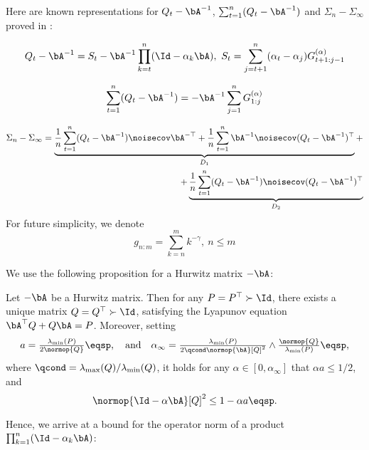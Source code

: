 Here are known representations for $Q_t - \bA^{-1}$, $\sum_{t=1}^n (Q_t - \bA^{-1})$ and $\Sigma_n -  \Sigma_{\infty}$ proved in \citep[pp. 26-30]{wu2024statisticalinferencetemporaldifference}:

\begin{equation}
    \label{repr:qtminusa}
    Q_t - \bA^{-1} = S_t - \bA^{-1} \prod_{k=t}^n (\Id - \alpha_k \bA),~ S_t = \sum_{j=t+1}^{n} (\alpha_t - \alpha_j) G_{t+1:j-1}^{(\alpha)}
\end{equation}

\begin{equation}
    \label{repr:sumqtminusa}
    \sum_{t=1}^n (Q_t - \bA^{-1}) = -\bA^{-1} \sum_{j=1}^n G_{1:j}^{(\alpha)}
\end{equation}

\begin{align}
    \label{repr:Lstar_minus_Ln}
    \Sigma_n - \Sigma_{\infty} = \underbrace{\frac{1}{n}\sum_{t=1}^n (Q_t - \bA^{-1})\noisecov \bA^{-\top} + \frac{1}{n} \sum_{t=1}^n \bA^{-1} \noisecov (Q_t - \bA^{-1})^\top}_{D_1} + \\ + \underbrace{\frac{1}{n} \sum_{t=1}^n (Q_t - \bA^{-1}) \noisecov (Q_t - \bA^{-1})^{\top}}_{D_2}
\end{align}
For future simplicity, we denote 
\begin{equation}
    \label{def:gnm}
    g_{n:m} = \sum_{k=n}^m k^{-\gamma},~ n \leq m
\end{equation}

We use the following proposition \cite[Proposition~1]{samsonov2024gaussian} for a Hurwitz matrix $-\bA$:

\begin{proposition}
\label{prop:hurwitz_stability}
Let $-\bA$ be a Hurwitz matrix. Then for any $P = P^{\top} \succ \Id$, there exists a unique matrix $Q = Q^{\top} \succ \Id$, satisfying the Lyapunov equation $\bA^\top Q + Q \bA = P$. Moreover, setting
\begin{equation}
\label{eq:alpha_infty_def}
\textstyle 
a = \frac{\lambda_{\min}(P)}{2\normop{Q}}\eqsp, \quad
\text{and} \quad \alpha_\infty = \frac{\lambda_{\min}(P)}{2\qcond \normop{\bA}[Q]^{2}}\wedge \frac{\normop{Q}}{\lambda_{\min}(P)} \eqsp,
\end{equation}
where $\qcond = \lambda_{\max}(Q)/\lambda_{\min}(Q)$, it holds for any $\alpha \in [0, \alpha_{\infty}]$ that $\alpha a \leq 1/2$, and
\begin{equation}
\label{eq:contractin_q_norm}
\normop{\Id - \alpha \bA}[Q]^2 \leq 1 - \alpha a\eqsp.    
\end{equation}
\end{proposition}
Hence, we arrive at a bound for the operator norm of a product $\prod_{k=1}^n (\Id - \alpha_k \bA)$:

